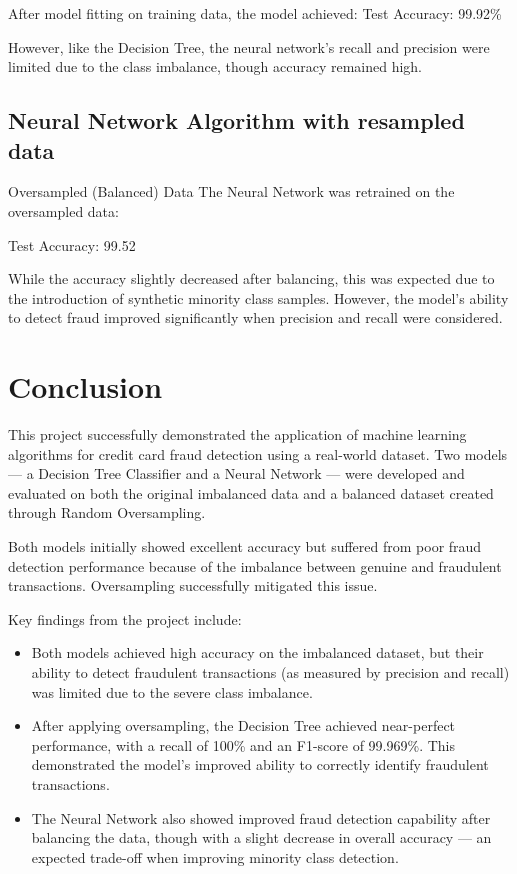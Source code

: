 \documentclass[11pt]{article}
\begin{document}
After model fitting on training data, the model achieved:
 Test Accuracy: 99.92\%

However, like the Decision Tree, the neural network’s recall and precision were limited due to the class imbalance, though accuracy remained high.

\subsection{Neural Network Algorithm with resampled data}
Oversampled (Balanced) Data
The Neural Network was retrained on the oversampled data:

Test Accuracy: 99.52%

While the accuracy slightly decreased after balancing, this was expected due to the introduction of synthetic minority class samples. However, the model’s ability to detect fraud improved significantly when precision and recall were considered. 

\section{Conclusion}
This project successfully demonstrated the application of machine learning algorithms for credit card fraud detection using a real-world dataset. Two models — a Decision Tree Classifier and a Neural Network — were developed and evaluated on both the original imbalanced data and a balanced dataset created through Random Oversampling. 

Both models initially showed excellent accuracy but suffered from poor fraud detection performance because of the imbalance between genuine and fraudulent transactions. Oversampling successfully mitigated this issue.

Key findings from the project include:

\begin{itemize}
	\item Both models achieved high accuracy on the imbalanced dataset, but their ability to detect fraudulent transactions (as measured by precision and recall) was limited due to the severe class imbalance. 
	
	\item After applying oversampling, the Decision Tree achieved near-perfect performance, with a recall of 100\% and an F1-score of 99.969\%. This demonstrated the model’s improved ability to correctly identify fraudulent transactions.
	
	\item The Neural Network also showed improved fraud detection capability after balancing the data, though with a slight decrease in overall accuracy — an expected trade-off when improving minority class detection.	
\end{itemize}	
\end{document}

